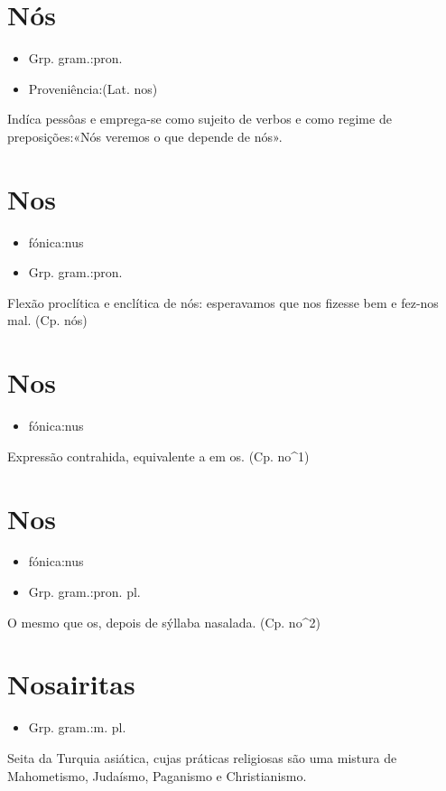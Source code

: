 \section{Nós}
\begin{itemize}
\item {Grp. gram.:pron.}
\end{itemize}
\begin{itemize}
\item {Proveniência:(Lat. \textunderscore nos\textunderscore )}
\end{itemize}
Indíca pessôas e emprega-se como sujeito de verbos e como regime de preposições:«\textunderscore Nós veremos o que depende de nós\textunderscore ».
\section{Nos}
\begin{itemize}
\item {fónica:nus}
\end{itemize}
\begin{itemize}
\item {Grp. gram.:pron.}
\end{itemize}
Flexão proclítica e enclítica de \textunderscore nós\textunderscore : \textunderscore esperavamos que nos fizesse bem e fez-nos mal\textunderscore .
(Cp. \textunderscore nós\textunderscore )
\section{Nos}
\begin{itemize}
\item {fónica:nus}
\end{itemize}
Expressão contrahida, equivalente a \textunderscore em os\textunderscore .
(Cp. \textunderscore no\textunderscore ^1)
\section{Nos}
\begin{itemize}
\item {fónica:nus}
\end{itemize}
\begin{itemize}
\item {Grp. gram.:pron. pl.}
\end{itemize}
O mesmo que \textunderscore os\textunderscore , depois de sýllaba nasalada.
(Cp. \textunderscore no\textunderscore ^2)
\section{Nosairitas}
\begin{itemize}
\item {Grp. gram.:m. pl.}
\end{itemize}
Seita da Turquia asiática, cujas práticas religiosas são uma mistura de Mahometismo, Judaísmo, Paganismo e Christianismo.
